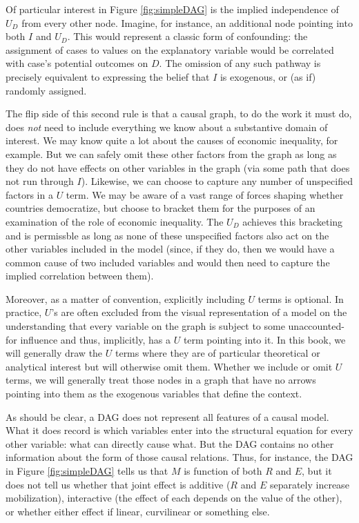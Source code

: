 \documentclass[12pt,]{book}
\begin{document}
Of particular interest in Figure \ref{fig:simpleDAG} is the implied independence of \(U_D\) from every other node. Imagine, for instance, an additional node pointing into both \(I\) and \(U_D\). This would represent a classic form of confounding: the assignment of cases to values on the explanatory variable would be correlated with case's potential outcomes on \(D\). The omission of any such pathway is precisely equivalent to expressing the belief that \(I\) is exogenous, or (as if) randomly assigned.

The flip side of this second rule is that a causal graph, to do the work it must do, does \emph{not} need to include everything we know about a substantive domain of interest. We may know quite a lot about the causes of economic inequality, for example. But we can safely omit these other factors from the graph as long as they do not have effects on other variables in the graph (via some path that does not run through \(I\)). Likewise, we can choose to capture any number of unspecified factors in a \(U\) term. We may be aware of a vast range of forces shaping whether countries democratize, but choose to bracket them for the purposes of an examination of the role of economic inequality. The \(U_D\) achieves this bracketing and is permissble as long as none of these unspecified factors also act on the other variables included in the model (since, if they do, then we would have a common cause of two included variables and would then need to capture the implied correlation between them).

Moreover, as a matter of convention, explicitly including \(U\) terms is optional. In practice, \(U\)'s are often excluded from the visual representation of a model on the understanding that every variable on the graph is subject to some unaccounted-for influence and thus, implicitly, has a \(U\) term pointing into it. In this book, we will generally draw the \(U\) terms where they are of particular theoretical or analytical interest but will otherwise omit them. Whether we include or omit \(U\) terms, we will generally treat those nodes in a graph that have no arrows pointing into them as the exogenous variables that define the context.

As should be clear, a DAG does not represent all features of a causal model. What it does record is which variables enter into the structural equation for every other variable: what can directly cause what. But the DAG contains no other information about the form of those causal relations. Thus, for instance, the DAG in Figure \ref{fig:simpleDAG} tells us that \(M\) is function of both \(R\) and \(E\), but it does not tell us whether that joint effect is additive (\(R\) and \(E\) separately increase mobilization), interactive (the effect of each depends on the value of the other), or whether either effect if linear, curvilinear or something else.
\end{document}
